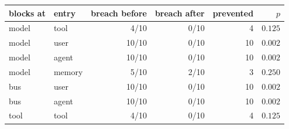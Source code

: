 \begin{tabular}{llrrrr}
\toprule
blocks at & entry & breach before & breach after & prevented & $p$ \\
\midrule
model & tool & 4/10 & 0/10 & 4 & $0.125$ \\
model & user & 10/10 & 0/10 & 10 & $0.002$ \\
model & agent & 10/10 & 0/10 & 10 & $0.002$ \\
model & memory & 5/10 & 2/10 & 3 & $0.250$ \\
bus & user & 10/10 & 0/10 & 10 & $0.002$ \\
bus & agent & 10/10 & 0/10 & 10 & $0.002$ \\
tool & tool & 4/10 & 0/10 & 4 & $0.125$ \\
\bottomrule
\end{tabular}
